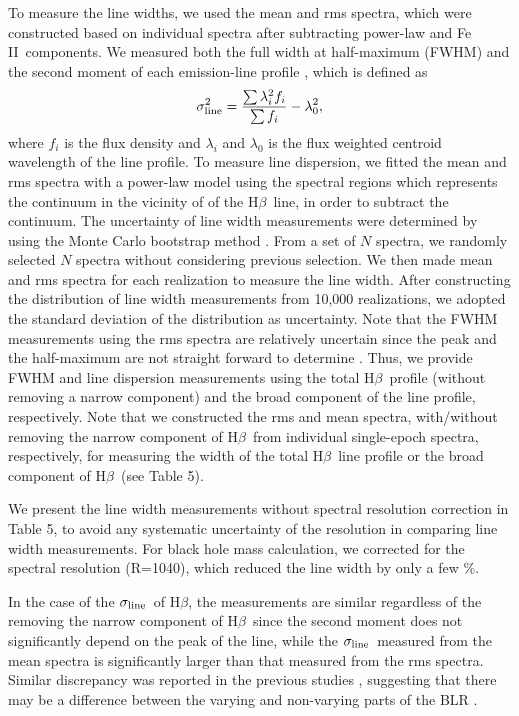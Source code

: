 \documentclass[iop]{emulateapj}
\newcommand{\Hb}{\rm H{$\beta$}}
\newcommand{\FeII}{Fe {\small II}}
\newcommand{\sigmaline}{$\sigma_{\rm line}$}
\begin{document}
To measure the line widths, we used the mean and rms spectra, which were constructed based on individual spectra after subtracting power-law and \FeII\ components. We measured both the full width at half-maximum (FWHM) and the second moment of each emission-line profile \citep[i.e., line dispersion \sigmaline;][]{Peterson2004}, which is defined as \begin{equation}\label{eq:linedisp}
\sigma_{\rm line}^{2}  = {\frac{\sum \lambda_{i}^{2} f_{i}}{\sum f_{i}} - \lambda_{0}^{2}}  ,
\end{equation}
where $f_{i}$ is the flux density and $\lambda_{i}$ and ${\lambda}_{0}$ is the flux weighted centroid wavelength of the line profile.
To measure line dispersion, we fitted the mean and rms spectra with a power-law model using the spectral regions which represents the continuum in the vicinity of of the \Hb\ line, in order to subtract the continuum.
The uncertainty of line width measurements were determined by using the Monte Carlo bootstrap method \citep{Peterson2004}. From a set of $N$ spectra, we randomly selected $N$ spectra without considering previous selection. We then made mean and rms spectra for each realization
to measure the line width. After constructing the distribution of line width measurements from 10,000 realizations, we adopted the standard deviation of the distribution as uncertainty.
Note that the FWHM measurements using the rms spectra are relatively uncertain since the peak and the half-maximum are not straight forward to determine \citep{Peterson2004}. Thus, we provide FWHM and line dispersion measurements using the total \Hb\ profile (without removing a narrow component) and the broad component of the line profile, respectively.
Note that we constructed the rms and mean spectra, with/without removing the narrow component of \Hb\ from individual single-epoch spectra, respectively, for measuring the width of the total \Hb\ line profile or the broad component of \Hb\ (see Table 5).

We present the line width measurements without spectral resolution correction in Table 5, to avoid any systematic uncertainty of the resolution in comparing line width measurements. For black hole mass calculation, we corrected for the spectral resolution (R=1040), which reduced the line width by only a few \%.

In the case of the \sigmaline\ of \Hb, the measurements are similar regardless of the removing the narrow component of \Hb\ since the second moment does not significantly depend on the peak of the line, while the \sigmaline\ measured from the mean spectra is significantly larger than that measured from the rms spectra. Similar discrepancy was reported in the previous studies \citep[e.g.,][]{Bentz2006,Pei2014}, suggesting that there may be a difference between the varying and non-varying parts of the BLR \citep[for example, see the discussion in][]{Park+12}.
\end{document}
